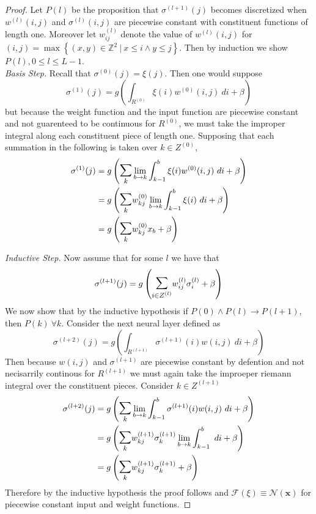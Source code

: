 \documentclass{ib-assignment}
\newcommand{\Sum}{\mathlarger{\mathlarger{\sum}}}
\begin{document}
\begin{proof}
Let $P(l)$ be the proposition that $\sigma^{(l+1)}(j)$ becomes discretized when $w^{(l)}(i,j)$ and $\sigma^{(l)}(i,j)$ are piecewise constant with constituent functions of length one. Moreover let $w_{ij}^{(l)}$ denote the value of $w^{(l)}(i,j)$ for $(i,j) = \max\left\{(x,y) \in \mathbb{Z}^2\ |\ x\leq i \wedge y \leq j\right\}$. Then by induction we show $P(l), 0 \leq l \leq L-1$. \\


\textit{Basis Step.} Recall that $\sigma^{(0)}(j) = \xi(j)$. Then one would suppose
$$\sigma^{(1)}(j) = g\left(\int_{R^{(0)}} \xi(i) w^{(0)}(i,j)\ di + \beta\right)$$
but because the weight function and the input function are piecewise constant and not guarenteed to be continuous for $R^{(0)}$, we must take the improper integral along each constituent piece of length one. Supposing that each summation in the following is taken over $k\in Z^{(0)}$,
\[
\begin{aligned}
	\sigma^{(1)}(j) &= g\left(\Sum_{k}\lim_{b\to k}\int_{k-1}^b\xi(i) w^{(0)}(i,j)\ di + \beta\right) \\
    &= g\left(\Sum_{k}w^{(0)}_{kj}\lim_{b\to k}\int_{k-1}^b\xi(i)\ di + \beta\right) \\
        &= g\left(\Sum_{k}w_{kj}^{(0)}x_b + \beta\right)
 \end{aligned}
 \]
 
 
\textit{Inductive Step.} Now assume that for some $l$ we have that
$$\sigma^{(l+1)}(j) = g\left(\Sum_{i\in Z^{(l)}}w_{ij}^{(l)}\sigma_i^{(l)} + \beta \right)$$
We now show that by the inductive hypothesis if $P(0) \wedge P(l) \to P(l+1)$, then $P(k)\  \forall k$. Consider the next neural layer defined as
$$\sigma^{(l+2)}(j) = g\left(\int_{R^{(l+1)}}\sigma^{(l+1)}(i) w(i,j)\ di + \beta\right)$$
Then because $w(i,j)$ and $\sigma^{(l+1)}$ are piecewise constant by defention and not necisarrily continous for $R^{(l+1)}$ we must again take the improeper riemann integral over the constituent pieces. Consider $k\in Z^{(l+1)}$
\[
	\begin{aligned}
    	\sigma^{(l+2)}(j) &= g\left(\Sum_{k}\lim_{b\to k}\int_{k-1}^b\sigma^{(l+1)}(i) w(i,j)\ di + \beta\right) \\
        								  &= g\left(\Sum_{k}w_{kj}^{(l+1)}\sigma_k^{(l+1)}\lim_{b\to k}\int_{k-1}^b\ di + \beta\right) \\
                                          &= g\left(\Sum_{k}w_{kj}^{(l+1)}\sigma_k^{(l+1)} + \beta\right)
    \end{aligned}
\]
Therefore by the inductive hypothesis the proof follows and $\mathcal{F}(\xi) \equiv \mathcal{N}(\pmb{x})$ for piecewise constant input and weight functions.

\end{proof}
\end{document}

